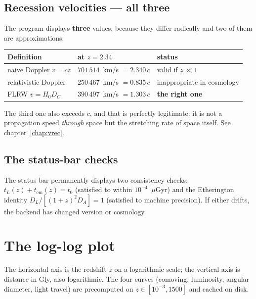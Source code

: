 \documentclass[11pt,a4paper,openany]{report}
\newcommand{\Hzero}{H_{0}}
\begin{document}
\subsection{Recession velocities --- all three}

\begin{tcolorbox}[gui]
The program displays \textbf{three} values, because they differ radically and
two of them are approximations:

\medskip
\begin{tabular}{lll}
\toprule
\textbf{Definition} & \textbf{at $z=2.34$} & \textbf{status} \\
\midrule
naive Doppler $v = cz$ & $701\,514$~km/s $=2.340\,c$ & valid if $z\ll1$ \\
relativistic Doppler & $250\,467$~km/s $=0.835\,c$ & inappropriate in cosmology \\
FLRW $v = \Hzero D_{C}$ & $390\,497$~km/s $=1.303\,c$ & \textbf{the right one} \\
\bottomrule
\end{tabular}

\medskip
The third one also exceeds $c$, and that is perfectly legitimate: it is not a
propagation speed \emph{through} space but the stretching rate of space itself.
See chapter~\ref{chap:vrec}.
\end{tcolorbox}

\subsection{The status-bar checks}

\begin{tcolorbox}[gui]
The status bar permanently displays two consistency checks:
$t_{L}(z) + t_{\text{em}}(z) = t_{0}$ (satisfied to within $10^{-4}$~$\mu$Gyr)
and the Etherington identity $D_{L}/[(1+z)^{2}D_{A}] = 1$ (satisfied to machine
precision). If either drifts, the backend has changed version or cosmology.
\end{tcolorbox}

\section{The log-log plot}

The horizontal axis is the redshift $z$ on a logarithmic scale; the vertical
axis is distance in Gly, also logarithmic. The four curves (comoving,
luminosity, angular diameter, light travel) are precomputed on
$z\in[10^{-3}, 1500]$ and cached on disk.
\end{document}
